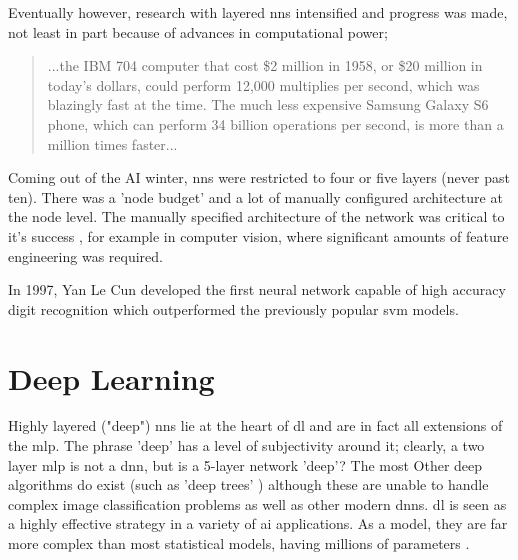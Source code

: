 
Eventually however, research with layered \gls{nn}s intensified and progress was made, not least in part because of advances in computational power;

\begin{quote}
...the IBM 704 computer that cost \$2 million in 1958, or \$20 million in today’s dollars, could perform 12,000 multiplies per second, which was blazingly fast at the time. The much less expensive Samsung Galaxy S6 phone, which can perform 34 billion operations per second, is more than a million times faster...\cite{unreasonable_dl}
\end{quote}


\bigskip
Coming out of the AI winter, \gls{nn}s were restricted to four or five layers (never past ten). There was a 'node budget' and a lot of manually configured architecture at the node level. The manually specified architecture of the network was critical to it's success \cite{manual_architecture}, for example in computer vision, where significant amounts of feature engineering was required. 

In 1997, Yan Le Cun developed the first neural network capable of high accuracy digit recognition which outperformed the previously popular \gls{svm} models. \bigskip


\section{Deep Learning}


Highly layered ("deep") \gls{nn}s lie at the heart of \gls{dl} and are in fact all extensions of the \gls{mlp}. The phrase 'deep' has a level of subjectivity around it; clearly, a two \gls{layer} \gls{mlp} is not a \gls{dnn}, but is a 5-layer network 'deep'? The most Other deep algorithms do exist (such as 'deep trees' \cite{deep_forest}) although these are unable to handle complex image classification problems as well as other modern {dnn}s. \gls{dl} is seen as a highly effective strategy in a variety of \gls{ai} applications. As a model, they are far more complex than most statistical models, having millions of parameters \cite{unreasonable_dl}.  \bigskip


